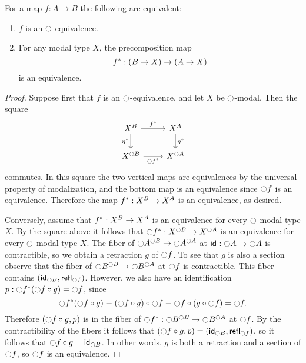 \documentclass[9pt,twosided]{amsart}
\begin{document}
\begin{lem}\label{lem:modal_equivalence}
For a map $f : A \to B$ the following are equivalent:
\begin{enumerate}
\item $f$ is an $\modal$-equivalence.
\item For any modal type $X$, the precomposition map
\begin{equation*}
\precomp{f} : (B \to X) \to (A \to X)
\end{equation*}
is an equivalence.
\end{enumerate}
\end{lem}

\begin{proof} 
Suppose first that $f$ is an $\modal$-equivalence, and let $X$ be $\modal$-modal. Then the square
\begin{equation*}
\begin{tikzcd}
X^B \arrow[r,"\precomp{f}"] \arrow[d,swap,"\precomp{\eta}"] & X^A \arrow[d,"\precomp{\eta}"] \\
X^{\modal B} \arrow[r,swap,"\precomp{\modal f}"] & X^{\modal A}
\end{tikzcd}
\end{equation*}
commutes. In this square the two vertical maps are equivalences by the universal property of modalization, and the bottom map is an equivalence since $\modal f$ is an equivalence. Therefore the map $\precomp{f}:X^B\to X^A$ is an equivalence, as desired.

Conversely, assume that $\precomp{f} : X^B \to X^A$ is an equivalence for every $\modal$-modal type $X$. By the square above it follows that $\precomp{\modal f}:X^{\modal B}\to X^{\modal A}$ is an equivalence for every $\modal$-modal type $X$. The fiber of $\modal A^{\modal B}\to \modal A^{\modal A}$ at $\idfunc:\modal A\to \modal A$ is contractible, so we obtain a retraction $g$ of $\modal f$. To see that $g$ is also a section observe that the fiber of $\modal B^{\modal B}\to \modal B^{\modal A}$ at $\modal f$ is contractible. This fiber contains $(\idfunc[\modal B],\refl{\modal f})$. However, we also have an identification $p:\precomp{\modal f}(\modal f\circ g)=\modal f$, since
\begin{equation*}
\precomp{\modal f}(\modal f\circ g)\jdeq (\modal f \circ g)\circ \modal f\jdeq \modal f \circ (g\circ \modal f) = \modal f. 
\end{equation*}
Therefore $(\modal f\circ g,p)$ is in the fiber of $\precomp{\modal f}:\modal B^{\modal B}\to \modal B^{\modal A}$ at $\modal f$. By the contractibility of the fibers it follows that $(\modal f\circ g,p)=(\idfunc[\modal B],\refl{\modal f})$, so it follows that $\modal f\circ g=\idfunc[\modal B]$. In other words, $g$ is both a retraction and a section of $\modal f$, so $\modal f$ is an equivalence.
\end{proof}
\end{document}
